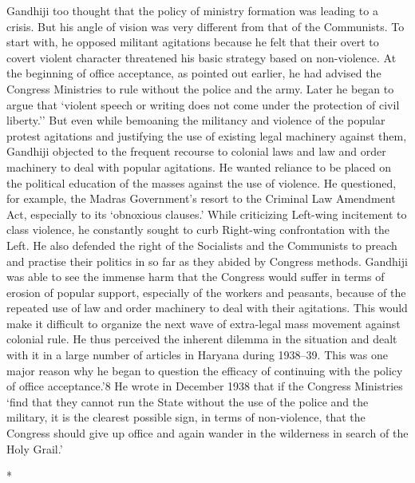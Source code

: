 Gandhiji too thought that the policy of ministry formation was leading to a crisis. But his angle of vision was very different from that of the Communists. To start with, he opposed militant agitations because he felt that their overt to covert violent character threatened his basic strategy based on non-violence. At the beginning of office acceptance, as pointed out earlier, he had advised the Congress Ministries to rule without the police and the army. Later he began to argue that `violent speech or writing does not come under the protection of civil liberty.'' But even while bemoaning the militancy and violence of the popular protest agitations and justifying the use of existing legal machinery against them, Gandhiji objected to the frequent recourse to colonial laws and law and order machinery to deal with popular agitations. He wanted reliance to be placed on the political education of the masses against the use of violence. He questioned, for example, the Madras Government's resort to the Criminal Law Amendment Act, especially to its `obnoxious clauses.' While criticizing Left-wing incitement to class violence, he constantly sought to curb Right-wing confrontation with the Left. He also defended the right of the Socialists and the Communists to preach and practise their politics in so far as they abided by Congress methods. Gandhiji was able to see the immense harm that the Congress would suffer in terms of erosion of popular support, especially of the workers and peasants, because of the repeated use of law and order machinery to deal with their agitations. This would make it difficult to organize the next wave of extra-legal mass movement against colonial rule. He thus perceived the inherent dilemma in the situation and dealt with it in a large number of articles in Haryana during 1938--39. This was one major reason why he began to question the efficacy of continuing with the policy of office acceptance.'8 He wrote in December 1938 that if the Congress Ministries `find that they cannot run the State without the use of the police and the military, it is the clearest possible sign, in terms of non-violence, that the Congress should give up office and again wander in the wilderness in search of the Holy Grail.'

\begin{center}*\end{center}

\paragraph*{}


